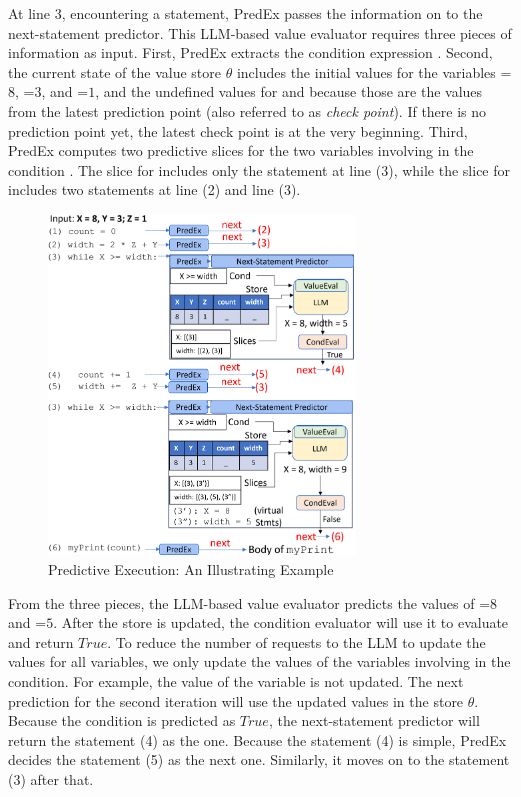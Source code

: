 At line 3, encountering a  statement, PredEx passes the
information on to the next-statement predictor. This LLM-based value
evaluator requires three pieces of information as
input. First, PredEx extracts the condition expression . Second, the current state of the value store $\theta$ includes the
initial values for the variables =$8$, =$3$, and =$1$, and
the undefined values for  and  because those are the
values from the latest prediction point (also referred to as {\em
  check point}). If there is no prediction point yet, the latest check
point is at the very beginning. Third, PredEx computes two predictive
slices for the two variables involving in the condition
. The slice for  includes only the statement at line
(3), while the slice for  includes two statements at line (2)
and line (3).

\begin{figure}
\begin{center}
\includegraphics[width=3.2in]{example-4.png}
\vspace{-13pt}
\caption{Predictive Execution: An Illustrating Example}
\label{fig:illustration}
\end{center}
\end{figure}

From the three pieces, the LLM-based value evaluator
predicts the values of =$8$ and =$5$. After the store is
updated, the condition evaluator
will use it to evaluate  and return $True$. To reduce
the number of requests to the LLM to update the values for all
variables, we only update the values of the variables involving in the
condition. For example, the value of the variable  is not
updated. The next prediction for the second iteration
will use the updated values in the store $\theta$. Because the
condition is predicted as $True$, the next-statement predictor will
return the statement (4) as the one.
%
Because the statement (4) is simple, PredEx decides the
statement (5) as the next one. Similarly, it moves on to
the statement (3) after that.



